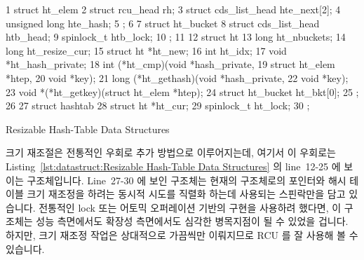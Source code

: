 \begin{listing}[tb]
{ \scriptsize
\begin{verbbox}
 1 struct ht_elem {
 2   struct rcu_head rh;
 3   struct cds_list_head hte_next[2];
 4   unsigned long hte_hash;
 5 };
 6 
 7 struct ht_bucket {
 8   struct cds_list_head htb_head;
 9   spinlock_t htb_lock;
10 };
11 
12 struct ht {
13   long ht_nbuckets;
14   long ht_resize_cur;
15   struct ht *ht_new;
16   int ht_idx;
17   void *ht_hash_private;
18   int (*ht_cmp)(void *hash_private,
19                 struct ht_elem *htep,
20                 void *key);
21   long (*ht_gethash)(void *hash_private,
22                      void *key);
23   void *(*ht_getkey)(struct ht_elem *htep);
24   struct ht_bucket ht_bkt[0];
25 };
26 
27 struct hashtab {
28   struct ht *ht_cur;
29   spinlock_t ht_lock;
30 };
\end{verbbox}
}
\centering
\theverbbox
\caption{Resizable Hash-Table Data Structures}
\label{lst:datastruct:Resizable Hash-Table Data Structures}
\end{listing}

크기 재조절은 전통적인 우회로 추가 방법으로 이루어지는데, 여기서 이 우회로는
Listing~\ref{lst:datastruct:Resizable Hash-Table Data Structures} 의 line~12-25
에 보이는  구조체입니다.
Line~27-30 에 보인  구조체는 현재의  구조체로의 포인터와
해시 테이블 크기 재조정을 하려는 동시적 시도를 직렬화 하는데 사용되는
스핀락만을 담고 있습니다.
전통적인 lock 또는 어토믹 오퍼레이션 기반의 구현을 사용하려 했다면, 이
 구조체는 성능 측면에서도 확장성 측면에서도 심각한 병목지점이 될 수
있었을 겁니다.
하지만, 크기 재조정 작업은 상대적으로 가끔씩만 이뤄지므로 RCU 를 잘 사용해 볼
수 있습니다.

